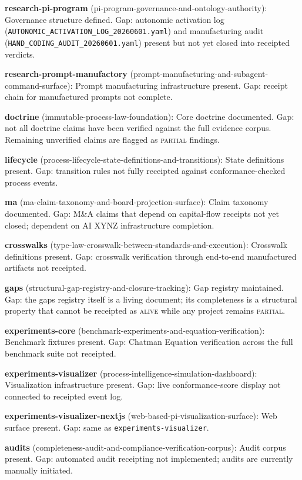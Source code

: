 \textbf{research-pi-program} (pi-program-governance-and-ontology-authority): Governance structure defined. Gap: autonomic activation log (\texttt{AUTONOMIC\_ACTIVATION\_LOG\_20260601.yaml}) and manufacturing audit (\texttt{HAND\_CODING\_AUDIT\_20260601.yaml}) present but not yet closed into receipted verdicts.

\textbf{research-prompt-manufactory} (prompt-manufacturing-and-subagent-command-surface): Prompt manufacturing infrastructure present. Gap: receipt chain for manufactured prompts not complete.

\textbf{doctrine} (immutable-process-law-foundation): Core doctrine documented. Gap: not all doctrine claims have been verified against the full evidence corpus. Remaining unverified claims are flagged as \textsc{partial} findings.

\textbf{lifecycle} (process-lifecycle-state-definitions-and-transitions): State definitions present. Gap: transition rules not fully receipted against conformance-checked process events.

\textbf{ma} (ma-claim-taxonomy-and-board-projection-surface): Claim taxonomy documented. Gap: M\&A claims that depend on capital-flow receipts not yet closed; dependent on AI XYNZ infrastructure completion.

\textbf{crosswalks} (type-law-crosswalk-between-standards-and-execution): Crosswalk definitions present. Gap: crosswalk verification through end-to-end manufactured artifacts not receipted.

\textbf{gaps} (structural-gap-registry-and-closure-tracking): Gap registry maintained. Gap: the gaps registry itself is a living document; its completeness is a structural property that cannot be receipted as \textsc{alive} while any project remains \textsc{partial}.

\textbf{experiments-core} (benchmark-experiments-and-equation-verification): Benchmark fixtures present. Gap: Chatman Equation verification across the full benchmark suite not receipted.

\textbf{experiments-visualizer} (process-intelligence-simulation-dashboard): Visualization infrastructure present. Gap: live conformance-score display not connected to receipted event log.

\textbf{experiments-visualizer-nextjs} (web-based-pi-visualization-surface): Web surface present. Gap: same as \texttt{experiments-visualizer}.

\textbf{audits} (completeness-audit-and-compliance-verification-corpus): Audit corpus present. Gap: automated audit receipting not implemented; audits are currently manually initiated.

